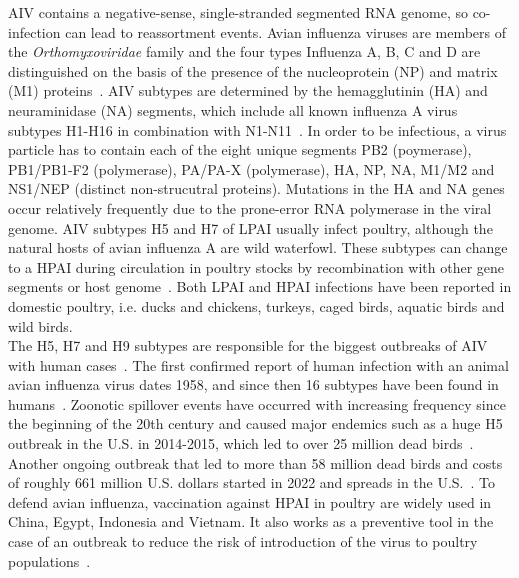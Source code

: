 AIV contains a negative-sense, single-stranded segmented RNA genome, so co-infection can lead to reassortment events. Avian influenza viruses are members of the \textit{Orthomyxoviridae} family and the four types Influenza A, B, C and D are distinguished on the basis of the presence of the nucleoprotein (NP) and matrix (M1) proteins~\cite{webster1992evolution}. AIV subtypes are determined by the hemagglutinin (HA) and neuraminidase (NA) segments, which include all known influenza A virus subtypes H1-H16 in combination with N1-N11~\cite{webster1992evolution, krammer2018influenza}. In order to be infectious, a virus particle has to contain each of the eight unique segments PB2 (poymerase), PB1/PB1-F2 (polymerase), PA/PA-X (polymerase), HA, NP, NA, M1/M2 and NS1/NEP (distinct non-strucutral proteins). Mutations in the HA and NA genes occur relatively frequently due to the prone-error RNA polymerase in the viral genome. AIV subtypes H5 and H7 of LPAI usually infect poultry, although the natural hosts of avian influenza A are wild waterfowl. These subtypes can change to a HPAI during circulation in poultry stocks by recombination with other gene segments or host genome~\cite{webster2006h5n1}. Both LPAI and HPAI infections have been reported in domestic poultry, i.e. ducks and chickens, turkeys, caged birds, aquatic birds and wild birds. \\
The H5, H7 and H9 subtypes are responsible for the biggest outbreaks of AIV with human cases~\cite{widdowson2017global}. The first confirmed report of human infection with an animal avian influenza virus dates 1958, and since then 16 subtypes have been found in humans~\cite{kluska1961demonstration}. Zoonotic spillover events have occurred with increasing frequency since the beginning of the 20th century and caused major endemics such as a huge H5 outbreak in the U.S. in 2014-2015, which led to over 25 million dead birds~\cite{seeger2021poultry}. Another ongoing outbreak that led to more than 58 million dead birds and costs of roughly 661 million U.S. dollars started in 2022 and spreads in the U.S.~\cite{usda2023hpai}. 
To defend avian influenza, vaccination against HPAI in poultry are widely used in China, Egypt, Indonesia and Vietnam. It also works as a preventive tool in the case of an outbreak to reduce the risk of introduction of the virus to poultry populations~\cite{swayne2013current, swayne2011assessment}. 

